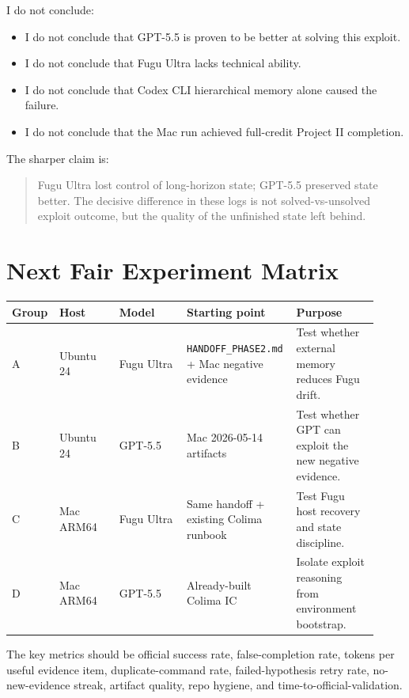 \documentclass[a4paper,11pt]{article}
\newcommand{\artifact}[1]{\texttt{#1}}
\begin{document}
I do not conclude:

\begin{itemize}
  \item I do not conclude that GPT-5.5 is proven to be better at solving this exploit.
  \item I do not conclude that Fugu Ultra lacks technical ability.
  \item I do not conclude that Codex CLI hierarchical memory alone caused the failure.
  \item I do not conclude that the Mac run achieved full-credit Project II completion.
\end{itemize}

The sharper claim is:

\begin{quote}
Fugu Ultra lost control of long-horizon state; GPT-5.5 preserved state better. The decisive difference in these logs is not solved-vs-unsolved exploit outcome, but the quality of the unfinished state left behind.
\end{quote}

\section{Next Fair Experiment Matrix}

\begin{longtable}{L{0.08\linewidth} L{0.16\linewidth} L{0.18\linewidth} L{0.28\linewidth} L{0.22\linewidth}}
\toprule
Group & Host & Model & Starting point & Purpose\\
\midrule
A & Ubuntu 24 & Fugu Ultra & \artifact{HANDOFF\_PHASE2.md} + Mac negative evidence & Test whether external memory reduces Fugu drift.\\
B & Ubuntu 24 & GPT-5.5 & Mac 2026-05-14 artifacts & Test whether GPT can exploit the new negative evidence.\\
C & Mac ARM64 & Fugu Ultra & Same handoff + existing Colima runbook & Test Fugu host recovery and state discipline.\\
D & Mac ARM64 & GPT-5.5 & Already-built Colima IC & Isolate exploit reasoning from environment bootstrap.\\
\bottomrule
\end{longtable}

The key metrics should be official success rate, false-completion rate, tokens per useful evidence item, duplicate-command rate, failed-hypothesis retry rate, no-new-evidence streak, artifact quality, repo hygiene, and time-to-official-validation.
\end{document}
